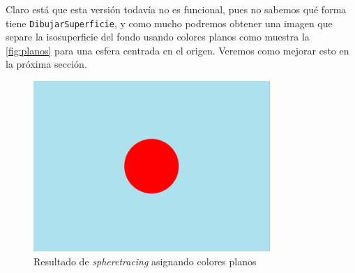 Claro está que esta versión todavía no es funcional, pues no sabemos qué forma tiene \texttt{DibujarSuperficie}, y como mucho podremos obtener una imagen que separe la isosuperficie del fondo usando colores planos como muestra la \autoref{fig:planos} para una esfera centrada en el origen. Veremos como mejorar esto en la próxima sección.
\begin{figure}[ht!]
    \centering
    \includegraphics[width=0.8\textwidth]{Plantilla-TFG-master/img/escenaPlana.png}
    \caption{Resultado de \textit{spheretracing} asignando colores planos}
    \label{fig:planos}
\end{figure}
